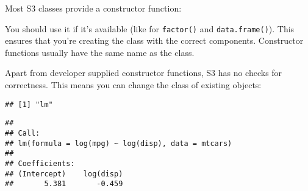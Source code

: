 Most S3 classes provide a constructor function:

\begin{Shaded}
\begin{Highlighting}[]
\StringTok{ }
  \NormalTok{ (}\OperatorTok{!}\NormalTok{(}\NormalTok{)}
  \NormalTok{(} \NormalTok{)}
\NormalTok{\}}
\end{Highlighting}
\end{Shaded}

You should use it if it's available (like for \texttt{factor()} and
\texttt{data.frame()}). This ensures that you're creating the class with
the correct components. Constructor functions usually have the same name
as the class.

Apart from developer supplied constructor functions, S3 has no checks
for correctness. This means you can change the class of existing
objects:

\begin{Shaded}
\begin{Highlighting}[]
\StringTok{ }\NormalTok{(}\OperatorTok{~}\StringTok{ }
\end{Highlighting}
\end{Shaded}

\begin{verbatim}
## [1] "lm"
\end{verbatim}

\begin{Shaded}
\begin{Highlighting}[]
\end{Highlighting}
\end{Shaded}

\begin{verbatim}
## 
## Call:
## lm(formula = log(mpg) ~ log(disp), data = mtcars)
## 
## Coefficients:
## (Intercept)    log(disp)  
##       5.381       -0.459
\end{verbatim}

\begin{Shaded}
\begin{Highlighting}[]
\end{Highlighting}
\end{Shaded}


